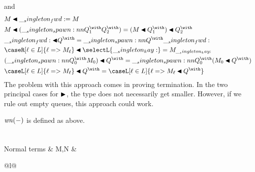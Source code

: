 and
\begin{equation*}
  \begin{lgathered}
    \qwspawn{M}{\fwd} = M \\
    \qwspawn{M}{(\spawn{Q^{\with}_1}{Q^{\with}_2})}
      = \qwspawn{(\qwspawn{M}{Q^{\with}_1})}{Q^{\with}_2} \\
    \qwspawn{\fwd}{Q^{\with}} = \spawn{Q^{\with}}{\fwd} \\
    \qwspawn{\caseR[\ell \in L]{\ell => M_{\ell}}}{\selectL{\kay}} = M_{\kay} \\
    \qwspawn{(\spawn{Q^{\with}_0}{M_0})}{Q^{\with}}
      = \spawn{Q^{\with}_0}{(\qwspawn{M_0}{Q^{\with}})} \\
    \qwspawn{\caseL[\ell \in L]{\ell => M_{\ell}}}{Q^{\with}}
      = \caseL[\ell \in L]{\ell => \qwspawn{M_{\ell}}{Q^{\with}}} \\
  \end{lgathered}
\end{equation*}
The problem with this approach comes in proving termination.  
In the two principal cases for $\nspawn{}{}$, the type does not necessarily get smaller.
However, if we rule out empty queues, this approach could work. 

$\mathit{wn}(-)$ is defined as above.

\section{}

\begin{syntax*}
  Normal terms & M,N &
    \begin{array}[t]{@{}l@{}}
       \mid {} \\
      \mathllap{\mid {}}  \mid {} \\
      \mathllap{\mid {}} \fwd
    \end{array}
\end{syntax*}



